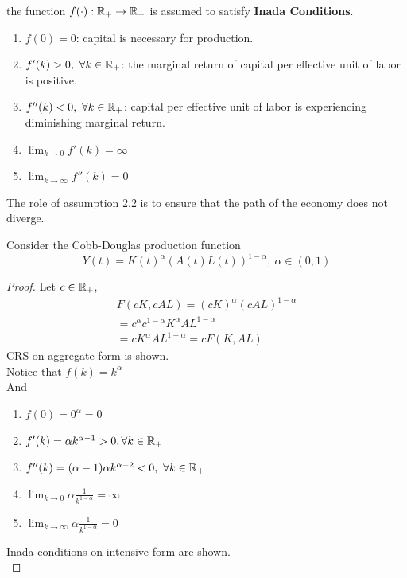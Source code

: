 \documentclass[11pt]{article}
\begin{document}
			\begin{assumption} the function $f(\cdot): \mathbb{R}_+ \rightarrow \mathbb{R}_+$ is assumed to satisfy \textbf{Inada Conditions}.
				\begin{enumerate}
					\item $f(0) = 0$: capital is necessary for production.
					\item $f'(k) > 0,\ \forall k \in \mathbb{R}_+$: the marginal return of capital per effective unit of labor is positive.
					\item $f''(k) < 0,\ \forall k \in \mathbb{R}_+$: capital per effective unit of labor is experiencing diminishing marginal return.
					\item $\lim_{k \to 0}f'(k) = \infty$
					\item $\lim_{k \to \infty}f''(k) = 0$
				\end{enumerate}
			\end{assumption}
			
			\begin{remark}	
			The role of assumption 2.2 is to ensure that the path of the economy does not diverge.
			\end{remark}
			
			\begin{example}
				Consider the Cobb-Douglas production function
				\begin{equation}
					Y(t) = K(t)^\alpha (A(t)L(t))^{1 - \alpha},\ \alpha \in (0, 1)
				\end{equation}
				
				\begin{proof}
					Let $c \in \mathbb{R}_+$, 
					\begin{gather}
						F(cK, cAL) = (cK)^\alpha (cAL)^{1 - \alpha} \\
						= c^\alpha c^{1-\alpha} K^\alpha AL^{1-\alpha} \\
						= cK^{\alpha} AL^{1-\alpha} = cF(K, AL)
					\end{gather}
					CRS on aggregate form is shown. \\
					Notice that $f(k) = k^{\alpha}$ \\
					And 
					\begin{enumerate}
						\item $f(0) = 0^{\alpha} = 0$
						\item $f'(k) = \alpha k ^ {\alpha - 1} > 0, \forall k \in \mathbb{R}_+$
						\item $f''(k) = (\alpha - 1)\alpha k ^ {\alpha - 2} < 0, \ \forall k \in \mathbb{R}_+$
						\item $\lim_{k \to 0} \alpha \frac{1}{k^{1-\alpha}} = \infty$
						\item $\lim_{k \to \infty} \alpha \frac{1}{k^{1-\alpha}} = 0$
					\end{enumerate}
					Inada conditions on intensive form are shown. \\
				\end{proof}
			\end{example}
			
\end{document}

